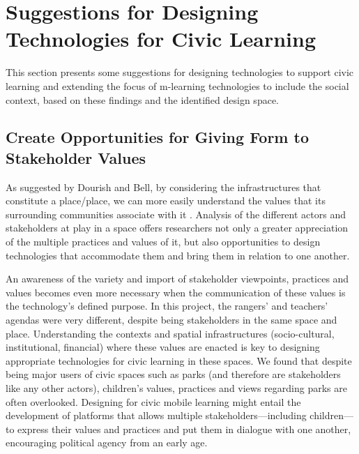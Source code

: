 \section{Suggestions for Designing Technologies for Civic Learning}
\label{sec:SuggestionsCivicLearning}

This section presents some suggestions for designing technologies to support civic learning and extending the focus of m-learning technologies to include the social context, based on these findings and the identified design space.

\subsection{Create Opportunities for Giving Form to Stakeholder Values}

As suggested by Dourish and Bell, by considering the infrastructures that constitute a place/place, we can more easily understand the values that its surrounding communities associate with it \citep{Dourish2007}. Analysis of the different actors and stakeholders at play in a space offers researchers not only a greater appreciation of the multiple practices and values of it, but also opportunities to design technologies that accommodate them and bring them in relation to one another.

An awareness of the variety and import of stakeholder viewpoints, practices and values becomes even more necessary when the communication of these values is the technology’s defined purpose. In this project, the rangers' and teachers' agendas were very different, despite being stakeholders in the same space and place. Understanding the contexts and spatial infrastructures (socio-cultural, institutional, financial) where these values are enacted is key to designing appropriate technologies for civic learning in these spaces. We found that despite being major users of civic spaces such as parks (and therefore are stakeholders like any other actors), children’s values, practices and views regarding parks are often overlooked. Designing for civic mobile learning might entail the development of platforms that allows multiple stakeholders---including children---to express their values and practices and put them in dialogue with one another, encouraging political agency from an early age.

